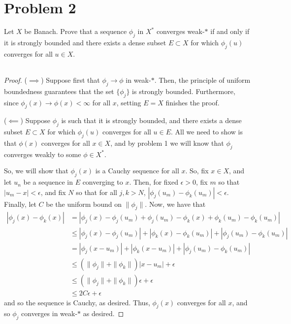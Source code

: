 \documentclass[fontsize=11pt]{scrartcl} %
\numberwithin{equation}{section} %
\numberwithin{figure}{section} %
\numberwithin{table}{section} %
\begin{document}
\section{Problem 2}
Let $X$ be Banach. Prove that a sequence $\phi_j$ in $X^*$ converges weak-$*$ if
and only if it is strongly bounded and there exists a dense subset $E\subset X$
for which $\phi_j(u)$ converges for all $u\in X$.
\\
\\
\begin{proof}
    ($\implies$)
    Suppose first that $\phi_j\to\phi$ in weak-$*$. Then, the principle of
    uniform boundedness guarantees that the set $\{\phi_j\}$ is strongly bounded.
    Furthermore, since $\phi_j(x)\to\phi(x) < \infty$ for all $x$, setting $E=X$
    finishes the proof.

    ($\impliedby$)
    Suppose $\phi_j$ is such that it is strongly bounded, and there exists a
    dense subset $E\subset X$ for which $\phi_j(u)$ converges for all $u\in E$.
    All we need to show is that $\phi(x)$ converges for all $x\in X$, and by
    problem 1 we will know that $\phi_j$ converges weakly to some $\phi\in X^*$.
    
    So, we will show that $\phi_j(x)$ is a Cauchy sequence for all $x$. So, fix
    $x\in X$, and let $u_n$ be a sequence in $E$ converging to $x$. Then, for
    fixed $\epsilon>0$, fix $m$ so that $|u_m - x|<\epsilon$, and fix $N$ so
    that for all $j,k > N$, $|\phi_j(u_m)-\phi_k(u_m)|<\epsilon$. Finally, let
    $C$ be the uniform bound on $\|\phi_j\|$. Now, we have
    that
    \[
\begin{aligned}
    |\phi_j(x) - \phi_k(x)| &= |\phi_j(x)-\phi_j(u_m)+\phi_j(u_m) -\phi_k(x) +
    \phi_k(u_m) - \phi_k(u_m)|\\
    &\leq |\phi_j(x)-\phi_j(u_m)| + |\phi_k(x)-\phi_k(u_m)| + |\phi_j(u_m) -
    \phi_k(u_m)|\\
    &= |\phi_j(x-u_m)| + |\phi_k(x-u_m)| + |\phi_j(u_m)-\phi_k(u_m)|\\
&\leq (\|\phi_j\| + \|\phi_k\|)|x-u_m| + \epsilon\\
&\leq (\|\phi_j\| + \|\phi_k\|)\epsilon + \epsilon\\
&\leq 2C\epsilon + \epsilon
\end{aligned}
    \]
    and so the sequence is Cauchy, as desired. Thus, $\phi_j(x)$ converges for
    all $x$, and so $\phi_j$ converges in weak-$*$ as desired.
\end{proof}
\end{document}
